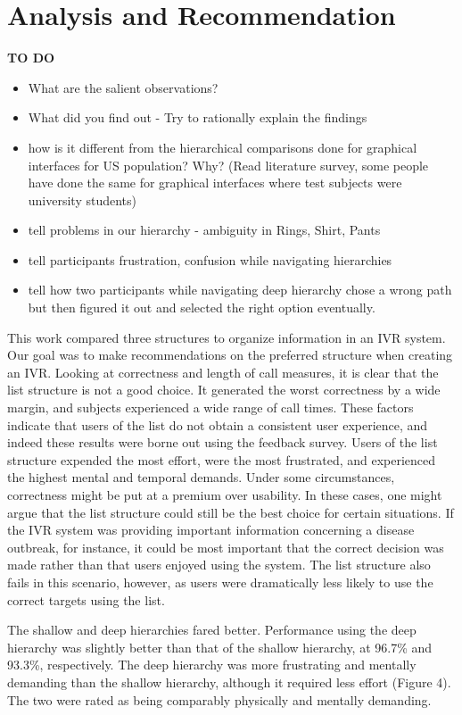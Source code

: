 \documentclass{sigchi}
\begin{document}
\section{Analysis and Recommendation}
\textbf{TO DO}
\begin{itemize}
\item What are the salient observations? 
\item What did you find out - Try to rationally explain the findings
\item how is it different from the hierarchical comparisons done for graphical interfaces for US population? Why? (Read literature survey, some people have done the same for graphical interfaces where test subjects were university students) 
\item tell problems in our hierarchy - ambiguity in Rings, Shirt, Pants
\item tell participants frustration, confusion while navigating hierarchies
\item tell how two participants while navigating deep hierarchy chose a wrong path but then figured it out and selected the right option eventually. 
\end{itemize}

This work compared three structures to organize information in an IVR system. Our goal was to make recommendations on the preferred structure when creating an IVR. Looking at correctness and length of call measures, it is clear that the list structure is not a good choice. It generated the worst correctness by a wide margin, and subjects experienced a wide range of call times. These factors indicate that users of the list do not obtain a consistent user experience, and indeed these results were borne out using the feedback survey. Users of the list structure expended the most effort, were the most frustrated, and experienced the highest mental and temporal demands. Under some circumstances, correctness might be put at a premium over usability. In these cases, one might argue that the list structure could still be the best choice for certain situations. If the IVR system was providing important information concerning a disease outbreak, for instance, it could be most important that the correct decision was made rather than that users enjoyed using the system. The list structure also fails in this scenario, however, as users were dramatically less likely to use the correct targets using the list.

The shallow and deep hierarchies fared better. Performance using the deep hierarchy was slightly better than that of the shallow hierarchy, at 96.7\% and 93.3\%, respectively. The deep hierarchy was more frustrating and mentally demanding than the shallow hierarchy, although it required less effort (Figure 4). The two were rated as being comparably physically and mentally demanding.
\end{document}
